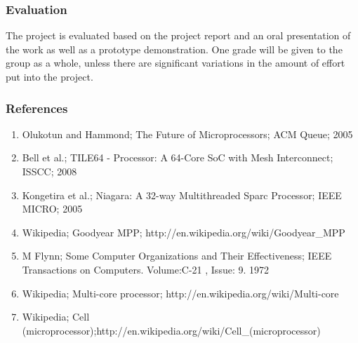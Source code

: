 \subsubsection{Evaluation}
The project is evaluated based on the project report and an oral presentation of the work as well as a 
prototype  demonstration.  One  grade  will  be  given  to  the  group  as  a  whole,  unless  there  are 
significant variations in the amount of effort put into the project.

\subsubsection{References}

\begin{enumerate}
	\item Olukotun and Hammond; The Future of Microprocessors; ACM Queue; 2005 
\item Bell et al.; TILE64 - Processor: A 64-Core SoC with Mesh Interconnect; ISSCC; 2008  
\item Kongetira et al.; Niagara: A 32-way Multithreaded Sparc Processor; IEEE MICRO; 2005 
\item Wikipedia; Goodyear MPP; http://en.wikipedia.org/wiki/Goodyear\_MPP 
\item M Flynn; Some Computer Organizations and Their Effectiveness; IEEE Transactions on Computers. Volume:C-21 ,  Issue: 9. 1972 
\item Wikipedia; Multi-core processor; http://en.wikipedia.org/wiki/Multi-core 
\item Wikipedia; Cell (microprocessor);http://en.wikipedia.org/wiki/Cell\_(microprocessor) 
\end{enumerate}
